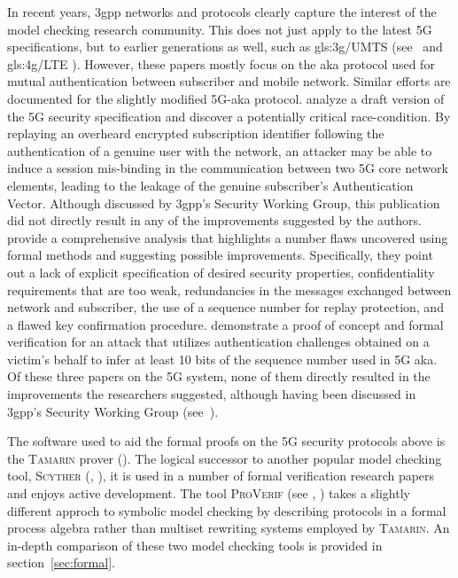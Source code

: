 In recent years, \gls{3gpp} networks and protocols clearly capture the interest of the model checking research community.
This does not just apply to the latest 5G specifications, but to earlier generations as well, such as \gls{gls:3g}/UMTS (see~\cite{alt2016cryptographic} and \gls{gls:4g}/LTE \cite{lee2014anonymity}).
However, these papers mostly focus on the \gls{aka} protocol used for mutual authentication between subscriber and mobile network.
Similar efforts are documented for the slightly modified 5G-\gls{aka} protocol.
\cite{dehnel2018security} analyze a draft version of the 5G security specification and discover a potentially critical race-condition.
By replaying an overheard encrypted subscription identifier following the authentication of a genuine user with the network, an attacker may be able to induce a session mis-binding in the communication between two 5G core network elements, leading to the leakage of the genuine subscriber's Authentication Vector.
Although discussed by \gls{3gpp}'s Security Working Group, this publication did not directly result in any of the improvements suggested by the authors.
\cite{basin2018formal} provide a comprehensive analysis that highlights a number flaws uncovered using formal methods and suggesting possible improvements.
Specifically, they point out a lack of explicit specification of desired security properties, confidentiality requirements that are too weak, redundancies in the messages exchanged between network and subscriber, the use of a sequence number for replay protection, and a flawed key confirmation procedure.
\cite{borgaonkar2019new} demonstrate a proof of concept and formal verification for an attack that utilizes authentication challenges obtained on a victim's behalf to infer at least 10 bits of the sequence number used in 5G \gls{aka}.
Of these three papers on the 5G system, none of them directly resulted in the improvements the researchers suggested, although having been discussed in \gls{3gpp}'s Security Working Group (see~\cite{s3-180727}).\medskip

The software used to aid the formal proofs on the 5G security protocols above is the \textsc{Tamarin} prover (\cite{meier2013tamarin}).
The logical successor to another popular model checking tool, \textsc{Scyther} (\cite{cremers2008scyther}, \cite{scyther}), it is used in a number of formal verification research papers and enjoys active development.
The tool \textsc{ProVerif} (see \cite{blanchet2016modeling}, \cite{proverif}) takes a slightly different approch to symbolic model checking by describing protocols in a formal process algebra rather than multiset rewriting systems employed by \textsc{Tamarin}.
An in-depth comparison of these two model checking tools is provided in section~\ref{sec:formal}.

